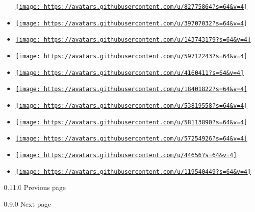 \begin{itemize}
  \href{https://github.com/MyrtleTurtle22}{\texttt{[image: https://avatars.githubusercontent.com/u/82775864?s=64\&v=4]}}
\item
  \href{https://github.com/T0mstone}{\texttt{[image: https://avatars.githubusercontent.com/u/39707032?s=64\&v=4]}}
\item
  \href{https://github.com/TheJosefOlsson}{\texttt{[image: https://avatars.githubusercontent.com/u/143743179?s=64\&v=4]}}
\item
  \href{https://github.com/antonWetzel}{\texttt{[image: https://avatars.githubusercontent.com/u/59712243?s=64\&v=4]}}
\item
  \href{https://github.com/denkspuren}{\texttt{[image: https://avatars.githubusercontent.com/u/4160411?s=64\&v=4]}}
\item
  \href{https://github.com/kokkonisd}{\texttt{[image: https://avatars.githubusercontent.com/u/18401822?s=64\&v=4]}}
\item
  \href{https://github.com/lihe07}{\texttt{[image: https://avatars.githubusercontent.com/u/53819558?s=64\&v=4]}}
\item
  \href{https://github.com/mattfbacon}{\texttt{[image: https://avatars.githubusercontent.com/u/58113890?s=64\&v=4]}}
\item
  \href{https://github.com/rezzubs}{\texttt{[image: https://avatars.githubusercontent.com/u/57254926?s=64\&v=4]}}
\item
  \href{https://github.com/samueltardieu}{\texttt{[image: https://avatars.githubusercontent.com/u/44656?s=64\&v=4]}}
\item
  \href{https://github.com/xalbd}{\texttt{[image: https://avatars.githubusercontent.com/u/119540449?s=64\&v=4]}}
\end{itemize}

\href{/docs/changelog/0.11.0/}{\pandocbounded{}}

{ 0.11.0 } { Previous page }

\href{/docs/changelog/0.9.0/}{\pandocbounded{}}

{ 0.9.0 } { Next page }
